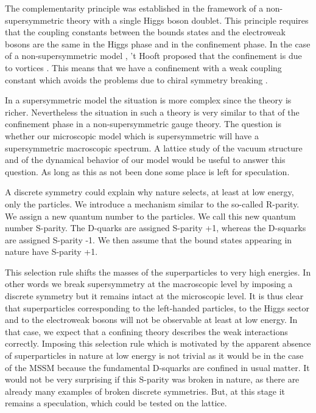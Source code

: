 \documentclass[a4paper,12pt]{article}
\begin{document}
The complementarity principle was established in the framework of a
non-supersymmetric theory with a single Higgs boson doublet. This
principle requires that the coupling constants between the bounds
states and the electroweak bosons are the same in the Higgs phase and
in the confinement phase. In the case of a non-supersymmetric model
\cite{CF}, 't Hooft proposed that the confinement is due to vortices
\cite{tHooft1}. This means that we have a confinement with a weak
coupling constant which avoids the problems due to chiral symmetry
breaking \cite{Hsu:1993zc}.

In a supersymmetric model the situation is more complex since the
theory is richer. Nevertheless the situation in such a theory is very
similar to that of the confinement phase in a non-supersymmetric gauge
theory.  The question is whether our microscopic model which is
supersymmetric will have a supersymmetric macroscopic spectrum.  A
lattice study of the vacuum structure and of the dynamical behavior of
our model would be useful to answer this question. As long as this as
not been done some place is left for speculation.

A discrete symmetry could explain why nature selects, at least at low
energy, only the particles.  We introduce a mechanism similar to the
so-called R-parity. We assign a new quantum number to the particles.
We call this new quantum number S-parity. The D-quarks are assigned
S-parity +1, whereas the D-squarks are assigned S-parity -1. We then
assume that the bound states appearing in nature have S-parity +1.

This selection rule shifts the masses of the superparticles to very
high energies. In other words we break supersymmetry at the
macroscopic level by imposing a discrete symmetry but it remains
intact at the microscopic level. It is thus clear that superparticles
corresponding to the left-handed particles, to the Higgs sector and to
the electroweak bosons will not be observable at least at low energy.
In that case, we expect that a confining theory describes the weak
interactions correctly.  Imposing this selection rule which is
motivated by the apparent absence of superparticles in nature at low
energy is not trivial as it would be in the case of the MSSM because
the fundamental D-squarks are confined in usual matter. It would not
be very surprising if this S-parity was broken in nature, as there are
already many examples of broken discrete symmetries. But, at this
stage it remains a speculation, which could be tested on the lattice.
\end{document}

